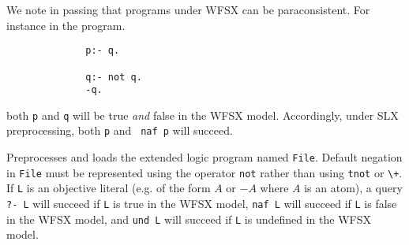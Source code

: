 We note in passing that programs under WFSX can be paraconsistent.
For instance in the program.
{\small
\begin{verbatim}
              p:- q.

              q:- not q.
              -q.
\end{verbatim}
}
both {\tt p} and {\tt q} will be true {\em and} false in the WFSX
model.  Accordingly, under SLX preprocessing, both {\tt p} and {\tt
naf p} will succeed.

\begin{description}
Preprocesses and loads the extended logic program named {\tt File}.
Default negation in {\tt File} must be represented using the operator
{\tt not} rather than using {\tt tnot} or \verb|\+|.  If {\tt L} is an
objective literal (e.g. of the form $A$ or $-A$ where $A$ is an atom),
a query {\tt ?- L} will succeed if {\tt L} is true in the WFSX model,
{\tt naf L} will succeed if {\tt L} is false in the WFSX model, and
{\tt und L} will succeed if {\tt L} is undefined in the WFSX model.
\end{description}



